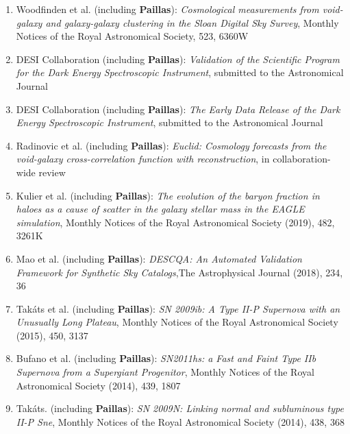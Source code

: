 \documentclass[12pt, a4paper]{article} %
\begin{document}
\begin{flushleft}
\begin{enumerate}
\item[9.] Woodfinden et al. (including \textbf{Paillas}): \textit{Cosmological measurements from void-galaxy and galaxy-galaxy clustering in the Sloan Digital Sky Survey}, Monthly Notices of the Royal Astronomical Society, 523, 6360W

\item[8.] DESI Collaboration (including \textbf{Paillas}): \textit{Validation of the Scientific Program for the Dark Energy Spectroscopic Instrument}, submitted to the Astronomical Journal

\item[7.] DESI Collaboration (including \textbf{Paillas}): \textit{The Early Data Release of the Dark Energy Spectroscopic Instrument}, submitted to the Astronomical Journal

\item[6.] Radinovic et al. (including \textbf{Paillas}): \textit{Euclid: Cosmology forecasts from the void-galaxy cross-correlation function with reconstruction}, in collaboration-wide review

\item[5.] Kulier et al. (including \textbf{Paillas}): \textit{The evolution of the baryon fraction in haloes as a cause of scatter in the galaxy stellar mass in the EAGLE simulation}, Monthly Notices of the Royal Astronomical Society (2019), 482, 3261K

\item[4.] Mao et al. (including \textbf{Paillas}): \textit{DESCQA: An Automated Validation Framework for Synthetic Sky Catalogs},The Astrophysical Journal (2018), 234, 36

\item[3.] Tak\'ats et al. (including \textbf{Paillas}): \textit{SN 2009ib: A Type II-P Supernova with an Unusually Long Plateau}, Monthly Notices of the Royal Astronomical Society (2015), 450, 3137

\item[2.] Bufano et al. (including \textbf{Paillas}): \textit{SN2011hs: a Fast and Faint Type IIb Supernova from a Supergiant Progenitor}, Monthly Notices of the Royal Astronomical Society (2014), 439, 1807

\item[1.] Tak\'ats. (including \textbf{Paillas}): \textit{SN 2009N: Linking normal and subluminous type II-P Sne}, Monthly Notices of the Royal Astronomical Society (2014), 438, 368

\end{enumerate}
\end{flushleft}
\end{document}
